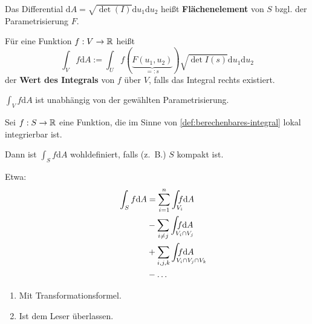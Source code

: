 \begin{definition}%
    \begin{defenum}
        \item Das Differential $\mathrm{d} A = \sqrt{\det (I)} \mathrm{d} u_1 \mathrm{d} u_2$
              heißt \textbf{Flächenelement} von $S$ bzgl. der Parametrisierung $F$.
        \item \label{def:berechenbares-integral}Für eine Funktion $f: V \rightarrow \mathbb{R}$ heißt
              \[\int_V f \mathrm{d} A := \int_U f(\underbrace{F(u_1, u_2)}_{=: s}) \sqrt{\det I(s)} \mathrm{d} u_1 \mathrm{d} u_2\]
              der \textbf{Wert des Integrals} von $f$ über $V$, falls das Integral rechts
              existiert.
    \end{defenum}

\end{definition}

\begin{bemerkung}
    \begin{bemenum}
        \item $\int_V f \mathrm{d} A$ ist unabhängig von der gewählten Parametrisierung.
        \item Sei $f: S \rightarrow \mathbb{R}$ eine Funktion, die im Sinne von
              \cref{def:berechenbares-integral} lokal integrierbar ist.

              Dann ist $\int_S f \mathrm{d} A$ wohldefiniert, falls (z.~B.) $S$
              kompakt ist.

              Etwa:
              \begin{align*}
                \int_S f \mathrm{d} A &= \sum_{i=1}^n \int_{\mathrlap{V_i}} f \mathrm{d} A \\
                &- \sum_{i \neq j} \int_{\mathrlap{V_i \cap V_j}} f \mathrm{d} A \\
                &+ \sum_{i,j,k} \int_{\mathrlap{V_i \cap V_j \cap V_k}} f \mathrm{d} A\\
                &- \dots
              \end{align*}
    \end{bemenum}
\end{bemerkung}

\begin{beweis}\leavevmode
    \begin{enumerate}[label=\alph*)]
        \item Mit Transformationsformel.%
        \item Ist dem Leser überlassen.%
    \end{enumerate}
\end{beweis}

